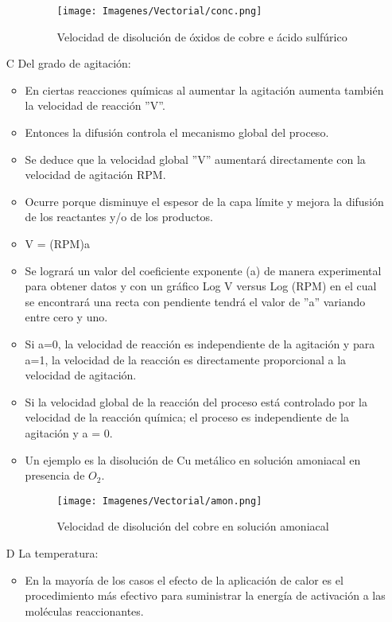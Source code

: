 \begin{itemize}
\begin{itemize}
 \begin{figure}[H]
 \centering
 \texttt{[image: Imagenes/Vectorial/conc.png]}
 \caption{Velocidad de disoluci\'on de \'oxidos de cobre e \'acido sulf\'urico}
 \label{fig:con}
\end{figure}
\end{itemize}
\item[C] Del grado de agitaci\'on:
\begin{itemize}
 \item En ciertas reacciones qu\'imicas al aumentar la agitaci\'on aumenta tambi\'en la velocidad de reacci\'on ''V''.
\item Entonces la difusi\'on controla el mecanismo global del proceso.
\item Se deduce que la velocidad global ''V'' aumentar\'a directamente con la velocidad de agitaci\'on RPM.
\item Ocurre porque disminuye el espesor de la capa límite y mejora la difusi\'on de los reactantes y/o de los productos.
\item V = (RPM)a
\item Se lograr\'a un valor del coeficiente exponente (a) de manera experimental para obtener datos y con un gr\'afico Log V versus Log (RPM) en el cual se encontrar\'a una recta con	pendiente tendr\'a el valor de ''a'' variando entre cero y uno.
\item Si a=0, la velocidad	 de reacci\'on	es independiente de la agitaci\'on y para a=1,	la velocidad de la reacci\'on	es directamente proporcional a la velocidad de agitaci\'on.
\item Si la velocidad global de la reacci\'on del proceso est\'a controlado por la velocidad de la reacci\'on qu\'imica; el proceso es independiente de la agitaci\'on y a = 0.
\item Un ejemplo es la disoluci\'on de Cu met\'alico en	soluci\'on amoniacal en presencia de $O_2$.
\begin{figure}[H]
 \centering
 \texttt{[image: Imagenes/Vectorial/amon.png]}
 \caption{Velocidad de disoluci\'on del cobre en soluci\'on amoniacal}
 \label{fig:am}
\end{figure}
\end{itemize}
\item[D] La temperatura:
\begin{itemize}
 \item En la mayor\'ia de los casos el efecto de la aplicaci\'on de calor es el procedimiento m\'as efectivo para suministrar la energ\'ia de activaci\'on a las mol\'eculas reaccionantes.

\end{itemize}
\end{itemize}
